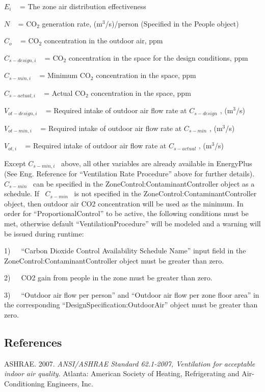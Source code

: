 \({E_i}\) ~ = The zone air distribution effectiveness

\(N\) ~ = CO\(_{2}\) generation rate, (m\(^{3}\)/s)/person (Specified in the People object)

\({C_o}\) ~ = CO\(_{2}\) concentration in the outdoor air, ppm

\({C_{s - design,i}}\) ~ = CO\(_{2}\) concentration in the space for the design conditions, ppm

\({C_{s - min,i}}\) ~ = Minimum CO\(_{2}\) concentration in the space, ppm

\({C_{s - actual,i}}\) ~ = Actual CO\(_{2}\) concentration in the space, ppm

\({V_{ot - design,i}}\) ~ = Required intake of outdoor air flow rate at \({C_{s - design}}\) , (m\(^{3}\)/s)

\({V_{ot - min,i}}\) ~ = Required intake of outdoor air flow rate at \({C_{s - min}}\) , (m\(^{3}\)/s)

\({V_{ot,i}}\) ~ = Required intake of outdoor air flow rate at \({C_{s - actual}}\) , (m\(^{3}\)/s)

Except \({C_{s - min,i}}\) ~above, all other variables are already available in EnergyPlus (See Eng. Reference for ``Ventilation Rate Procedure'' above for further details). \({C_{s - min}}\) ~can be specified in the ZoneControl:ContaminantController object as a schedule. If~ \({C_{s - min}}\) ~is not specified in the ZoneControl:ContaminantController object, then outdoor air CO2 concentration will be used as the minimum. In order for ``ProportionalControl'' to be active, the following conditions must be met, otherwise default ``VentilationProcedure'' will be modeled and a warning will be issued during runtime:

1)~~~``Carbon Dioxide Control Availability Schedule Name'' input field in the ZoneControl:ContaminantController object must be greater than zero.

2)~~~CO2 gain from people in the zone must be greater than zero.

3)~~~``Outdoor air flow per person'' and ``Outdoor air flow per zone floor area'' in the corresponding ``DesignSpecification:OutdoorAir'' object must be greater than zero.

\subsection{References}\label{references-018}

ASHRAE. 2007. \emph{ANSI/ASHRAE Standard 62.1-2007, Ventilation for acceptable indoor air quality}. Atlanta: American Society of Heating, Refrigerating and Air-Conditioning Engineers, Inc.

